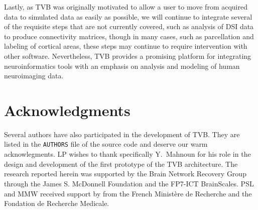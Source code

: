 \documentclass{bioinfo}
\begin{document}
Lastly, as TVB was originally motivated to allow a user to move from acquired
data to simulated data as easily as possible, we will continue to integrate
several of the requisite steps that are not currently covered, such as analysis
of DSI data to produce connectivity matrices, though in many cases, such as
parcellation and labeling of cortical areas, these steps may continue to
require intervention with other software. Nevertheless, TVB provides a
promising platform for integrating neuroinformatics tools with an emphasis on
analysis and modeling of human neuroimaging data.



\section*{Acknowledgments}
Several authors have also participated in the
development of TVB. They are listed in the \texttt{AUTHORS} file 
of the source code and deserve our warm acknowlegments. LP wishes to thank
specifically Y.~Mahnoun for his role in the design and development
of the first prototype of the TVB architecture. The research reported herein
was supported by the  Brain Network Recovery Group through the James S.
McDonnell Foundation and the FP7-ICT BrainScales. PSL and MMW received
support by from the French Minist\`{e}re de Recherche and the Fondation
de Recherche Medicale.



\end{document}

